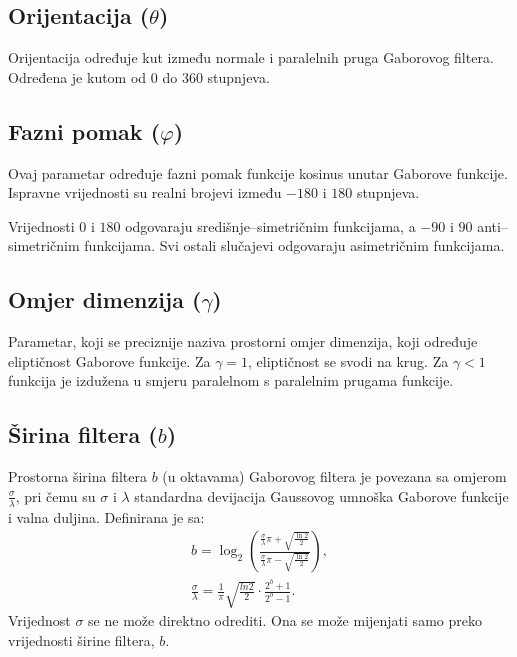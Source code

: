 \documentclass{article}
\begin{document}
\subsection{Orijentacija ($\theta$)}
Orijentacija određuje kut između normale i paralelnih pruga Gaborovog
filtera.
Određena je kutom od $0$ do $360$ stupnjeva.

\subsection{Fazni pomak ($\varphi$)}
Ovaj parametar određuje fazni pomak funkcije kosinus unutar Gaborove funkcije.
Ispravne vrijednosti su realni brojevi između $-180$ i $180$ stupnjeva.

Vrijednosti $0$ i $180$ odgovaraju središnje--simetričnim funkcijama, a $-90$ i
$90$ anti--simetričnim funkcijama. Svi ostali slučajevi odgovaraju asimetričnim
funkcijama.

\subsection{Omjer dimenzija ($\gamma $)}
Parametar, koji se preciznije naziva prostorni omjer dimenzija, koji određuje
eliptičnost Gaborove funkcije. Za $\gamma = 1$, eliptičnost se svodi na krug.
Za $\gamma < 1$ funkcija je izdužena u smjeru paralelnom s paralelnim prugama
funkcije.

\subsection{Širina filtera ($b$)}
Prostorna širina filtera $b$ (u oktavama) Gaborovog filtera je povezana sa
omjerom $\frac{\sigma}{\lambda}$, pri čemu su $\sigma$ i $\lambda$ standardna
devijacija Gaussovog umnoška Gaborove funkcije i valna duljina. Definirana je
sa:
\begin{eqnarray}
b = \log_2{\left (  \frac{\frac{\sigma}{\lambda}\pi + \sqrt{\frac{\ln2}{2}}}
{\frac{\sigma}{\lambda}\pi - \sqrt{\frac{\ln2}{2}}} \right )}, \\
\frac{\sigma}{\lambda} =
\frac{1}{\pi}\sqrt{\frac{ln2}{2}}\cdot\frac{2^b+1}{2^b-1}.
\end{eqnarray}
Vrijednost $\sigma$ se ne može direktno odrediti. Ona se može mijenjati samo
preko vrijednosti širine filtera, $b$.
\end{document}
